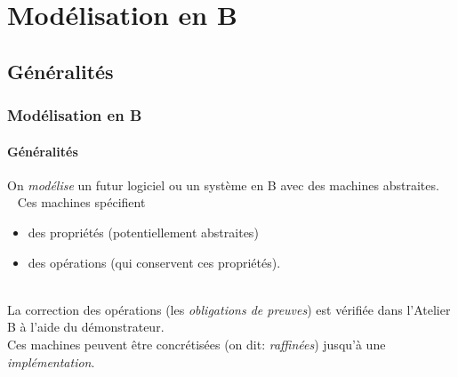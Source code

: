 \documentclass[11pt,a4paper,xcolor=table, handout]{beamer} %
\begin{document}

\section{Modélisation en B}
\subsection{Généralités}
\begin{frame}
\frametitle{Modélisation en B}
\framesubtitle{Généralités}
On \emph{modélise} un futur logiciel ou un système en B avec des machines abstraites.\\[5pt]~\pause
Ces machines spécifient\pause
\begin{itemize}
\item des propriétés (potentiellement abstraites)
\pause
\item des opérations (qui conservent ces propriétés).
\pause
\end{itemize}
~\\[0pt]
La correction des opérations (les \emph{obligations de preuves}) est vérifiée dans l'Atelier B à l'aide du démonstrateur.\pause\\[5pt]
Ces machines peuvent être concrétisées (on dit: \emph{raffinées}) jusqu'à une \emph{implémentation}.
\end{frame}
\end{document}
